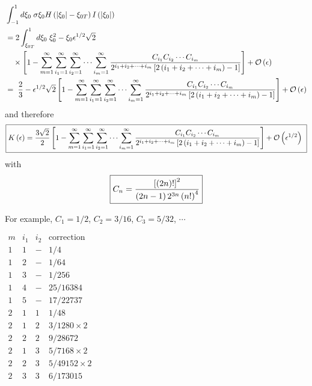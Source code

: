 \begin{align*}
& \int_{-1}^{1}d\xi_{0}\;\sigma\xi_{0}H\left( \left| \xi_{0}\right|
-\xi_{0T}\right) I\left( \left| \xi_{0}\right| \right) \\
&
=2\int_{\xi_{0T}}^{1}d\xi_{0}\;\xi_{0}^{2}-\xi_{0}\epsilon^{1/2}\sqrt
{2}\\&\quad\times\left[
1-\sum_{m=1}^{\infty}\sum_{i_{1}=1}^{\infty}\sum_{i_{2}=1}^{\infty
}\cdots\sum_{i_{m}=1}^{\infty}\frac{C_{i_{1}}C_{i_{2}}\cdots C_{i_{m}}}{%
2^{i_{1}+i_{2}+\cdots+i_{m}}\left[ 2\left( i_{1}+i_{2}+\cdots +i_{m}\right)
-1\right] }\right] +\mathcal{O}\left( \epsilon\right) \\
& =\;\frac{2}{3}-\epsilon^{1/2}\sqrt{2}\left[
1-\sum_{m=1}^{\infty}\sum_{i_{1}=1}^{\infty}\sum_{i_{2}=1}^{\infty}\cdots%
\sum_{i_{m}=1}^{\infty }\frac{C_{i_{1}}C_{i_{2}}\cdots C_{i_{m}}}{%
2^{i_{1}+i_{2}+\cdots+i_{m}}\left[ 2\left( i_{1}+i_{2}+\cdots+i_{m}\right)
-1\right] }\right] +\mathcal{O}\left( \epsilon\right)
\end{align*}
and therefore
\begin{equation}
\fbox{$\displaystyle K\left( \epsilon\right) =\frac{3\sqrt{2}}{2}\left[
1-\sum_{m=1}^{\infty
}\sum_{i_{1}=1}^{\infty}\sum_{i_{2}=1}^{\infty}\cdots\sum_{i_{m}=1}^{\infty }%
\frac{C_{i_{1}}C_{i_{2}}\cdots C_{i_{m}}}{2^{i_{1}+i_{2}+\cdots+i_{m}}\left[
2\left( i_{1}+i_{2}+\cdots+i_{m}\right) -1\right] }\right] +\mathcal{O}%
\left( \epsilon^{1/2}\right)$ }  \label{kappa}
\end{equation}
with
\[
\fbox{$\displaystyle
C_{n}=\frac{\left[ \left( 2n\right) !\right] ^{2}}{\left( 2n-1\right)
2^{3n}\left( n!\right) ^{4}}$}
\]

For example, $C_{1}=1/2$, $C_{2}=3/16$, $C_{3}=5/32$, $\cdots$

\begin{center}
$
\begin{array}{llll}
m & i_{1} & i_{2} & \text{correction} \\
1 & 1 & - & 1/4 \\
1 & 2 & - & 1/64 \\
1 & 3 & - & 1/256 \\
1 & 4 & - & 25/16384 \\
1 & 5 & - & 17/22737 \\
2 & 1 & 1 & 1/48 \\
2 & 1 & 2 & 3/1280\times2 \\
2 & 2 & 2 & 9/28672 \\
2 & 1 & 3 & 5/7168\times2 \\
2 & 2 & 3 & 5/49152\times2 \\
2 & 3 & 3 & 6/173015
\end{array}
$
\end{center}

